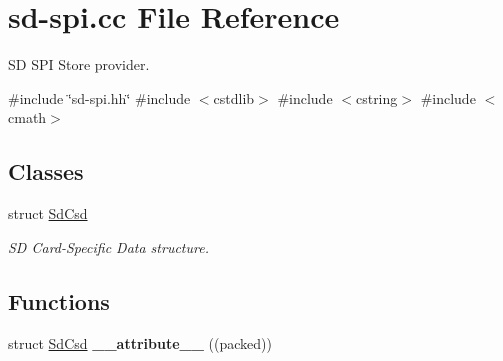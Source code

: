 \hypertarget{sd-spi_8cc}{}\section{sd-\/spi.cc File Reference}
\label{sd-spi_8cc}


SD S\+PI Store provider.  


{\ttfamily \#include \char`\"{}sd-\/spi.\+hh\char`\"{}}\newline
{\ttfamily \#include $<$cstdlib$>$}\newline
{\ttfamily \#include $<$cstring$>$}\newline
{\ttfamily \#include $<$cmath$>$}\newline
\subsection*{Classes}
\begin{DoxyCompactItemize}
\item 
struct \hyperlink{struct_sd_csd}{Sd\+Csd}
\begin{DoxyCompactList}\small\item\em SD Card-\/\+Specific Data structure. \end{DoxyCompactList}\end{DoxyCompactItemize}
\subsection*{Functions}
\begin{DoxyCompactItemize}
\item 
\mbox{\label{sd-spi_8cc_a65cc01dcd598989a32314bc110f023c6}} 
struct \hyperlink{struct_sd_csd}{Sd\+Csd} {\bfseries \+\_\+\+\_\+attribute\+\_\+\+\_\+} ((packed))
\end{DoxyCompactItemize}
